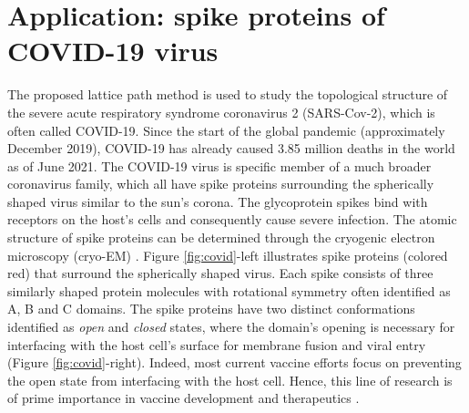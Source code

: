\documentclass{llncs}
\begin{document}
\section{Application: spike proteins of COVID-19 virus}
\vspace{-5pt}
The proposed lattice path  method is used to study the topological structure of the severe acute respiratory syndrome coronavirus 2 (SARS-Cov-2), which is often called COVID-19. Since the start of the global pandemic (approximately December 2019), COVID-19 has already caused 3.85 million deaths in the world as of June 2021. The COVID-19 virus is specific member of a much broader coronavirus family, which all have spike proteins surrounding the spherically shaped virus similar to the sun's corona. The glycoprotein spikes bind with receptors on the host's cells and consequently cause  severe infection. The atomic structure of spike proteins can be determined through the cryogenic electron microscopy (cryo-EM) \cite{walls.2020,cai.2020}. Figure \ref{fig:covid}-left illustrates spike proteins (colored red) that surround the spherically shaped virus. Each spike consists of three similarly shaped protein molecules with rotational symmetry often identified as A, B and C domains.  The spike proteins have two distinct conformations identified as {\em open} and {\em closed} states, where the domain's opening is necessary for interfacing with the host cell's surface for membrane fusion and viral entry (Figure \ref{fig:covid}-right). Indeed, most current vaccine efforts focus on preventing the open state from interfacing with the host cell. Hence, this line of research is of prime importance in vaccine development and therapeutics \cite{cai.2020}.
\end{document}
